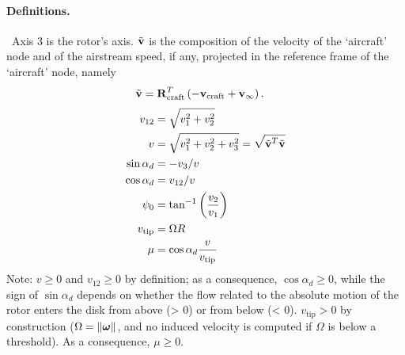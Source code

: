 %
%
%
%
%
% 
%
%
%

\paragraph{Definitions.} \
Axis 3 is the rotor's axis.
$\tilde{\bm{\mathbf{v}}}$ is the composition of the velocity of the `aircraft' node
and of the airstream speed, if any, projected in the reference frame
of the `aircraft' node, namely
\begin{align}
	\tilde{\bm{\mathbf{v}}}
	&=
	\bm{\mathbf{R}}_\text{craft}^T \left( 
		- \bm{\mathbf{v}}_\text{craft}
		+ \bm{\mathbf{v}}_\infty
	 \right)
	.
\end{align}
%
\begin{subequations}
\begin{align}
	v_{12}
	&=
	\sqrt{v_1^2 + v_2^2}
	\\
	v
	&=
	\sqrt{v_1^2 + v_2^2 + v_3^2}
	= \sqrt{\tilde{\bm{\mathbf{v}}}^T \tilde{\bm{\mathbf{v}}}}
	\\
	\sin\alpha_d
	&=
	-v_3/v
	\\
	\cos\alpha_d
	&=
	v_{12}/v
	\\
	\psi_0
	&=
	\tan^{-1}\left( \frac{v_2}{v_1} \right)
	\\
	v_\text{tip}
	&=
	\Omega R
	\\
	\mu
	&=
	\cos\alpha_d \frac{v}{v_\text{tip}}
\end{align}
\end{subequations}
Note: $v \ge 0$ and $v_{12} \ge 0$ by definition;
as a consequence, $\cos\alpha_d \ge 0$,
while the sign of $\sin\alpha_d$ depends on whether
the flow related to the absolute motion of the rotor
enters the disk from above (> 0) or from below (< 0).
$v_\text{tip} > 0$ by construction
($\Omega = \left\| \bm{\mathbf{\omega}} \right\|$, and no induced velocity
is computed if $\Omega$ is below a threshold).
As a consequence, $\mu \ge 0$.


